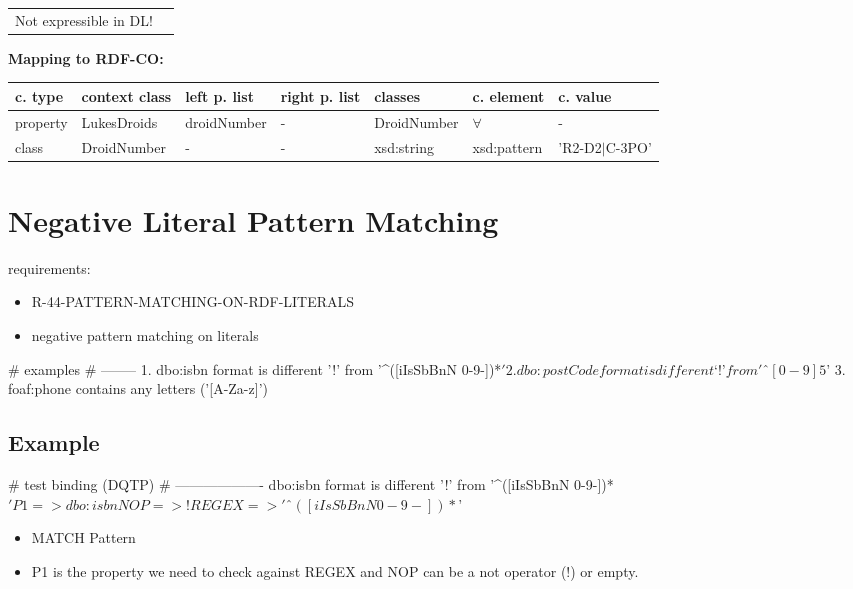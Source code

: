 \documentclass{llncs}
\newenvironment{gcotable}{
  \scriptsize
  \sffamily
  \vspace{0cm}
	\begin{center}
	\textbf{\vspace{0.4cm}Mapping to RDF-CO:} \\
  \begin{tabular}{l|l|l|l|l|l|l}
	\hline
  \textbf{c. type} & \textbf{context class} & \textbf{left p. list} & \textbf{right p. list} & \textbf{classes} & \textbf{c. element} & \textbf{c. value} \\
  \hline

}{
  \hline
  \end{tabular}
	\end{center}
}
\newenvironment{DL}{
  \vspace{0cm}
	\begin{center}
  \begin{tabular}{r l}

}{
  \end{tabular}
	\end{center}
}
\begin{document}
\begin{DL}
Not expressible in DL!
\end{DL}

\begin{gcotable}
property & LukesDroids & droidNumber & - & DroidNumber & $\forall$ & - \\
class & DroidNumber & - & - & xsd:string & xsd:pattern & 'R2-D2$|$C-3PO' \\
\end{gcotable}

\section{Negative Literal Pattern Matching}

requirements:

\begin{itemize}
  \item R-44-PATTERN-MATCHING-ON-RDF-LITERALS
\end{itemize}



\begin{itemize}
	\item negative pattern matching on literals
\end{itemize}

\begin{ex}
# examples
# --------
1. dbo:isbn format is different ’!’ from '^([iIsSbBnN 0-9-])*$'
2. dbo:postCode format is different ‘!’ from 'ˆ[0-9]{5}$'
3. foaf:phone contains any letters ('[A-Za-z]')
\end{ex}

\subsection{Example}

\begin{ex}
# test binding (DQTP)
# -------------------
dbo:isbn format is different ’!’ from '^([iIsSbBnN 0-9-])*$'

P1 => dbo:isbn
NOP => !
REGEX => 'ˆ([iIsSbBnN 0-9-])*$'
\end{ex}


\begin{itemize}
	\item MATCH Pattern \cite{Kontokostas2014} 
  \item P1 is the property we need to check against REGEX and
NOP can be a not operator (!) or empty.
\end{itemize}
\end{document}
